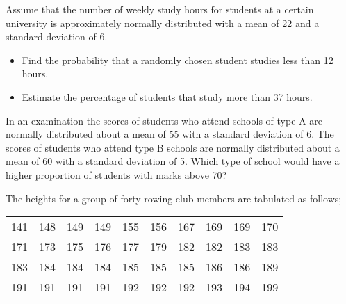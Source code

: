 \documentclass[]{article}
\begin{document}
Assume that the number of weekly study hours for students at a certain university
is approximately normally distributed with a mean of 22 and a standard deviation
of 6.
\begin{itemize}
\item Find the probability that a randomly chosen student studies less than 12
hours.
\item Estimate the percentage of students that study more than 37 hours.
\end{itemize}


%
%
%
%
%
In an examination the scores of students who attend schools of type A are
normally distributed about a mean of 55 with a standard deviation of 6. The
scores of students who attend type B schools are normally distributed about a
mean of 60 with a standard deviation of 5.
Which type of school would have a higher proportion of students with marks above 70?

The heights for a group of forty rowing club members are tabulated as follows;

\begin{table}[ht]
\begin{center}
\begin{tabular}{|rrrrrrrrrr|}

\hline
141 & 148 & 149 & 149 & 155 & 156 & 167 & 169 & 169 & 170 \\
171 & 173 & 175 & 176 & 177 & 179 & 182 & 182 & 183 & 183 \\
183 & 184 & 184 & 184 & 185 & 185 & 185 & 186 & 186 & 189 \\
191 & 191 & 191 & 191 & 192 & 192 & 192 & 193 & 194 & 199 \\
\hline
\end{tabular}
\end{center}
\end{table}
\end{document}
